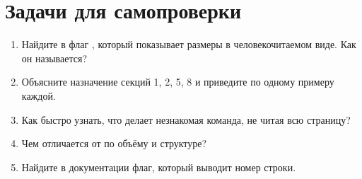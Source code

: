 \section{Задачи для самопроверки}
\begin{enumerate}
  \item Найдите в  флаг , который показывает
    размеры в человекочитаемом виде. Как он называется?
  \item Объясните назначение секций 1, 2, 5, 8 и приведите
    по одному примеру каждой.
  \item Как быстро узнать, что делает незнакомая команда,
    не читая всю страницу?
  \item Чем  отличается от  по
    объёму и структуре?
  \item Найдите в документации  флаг, который
    выводит номер строки.
\end{enumerate}
